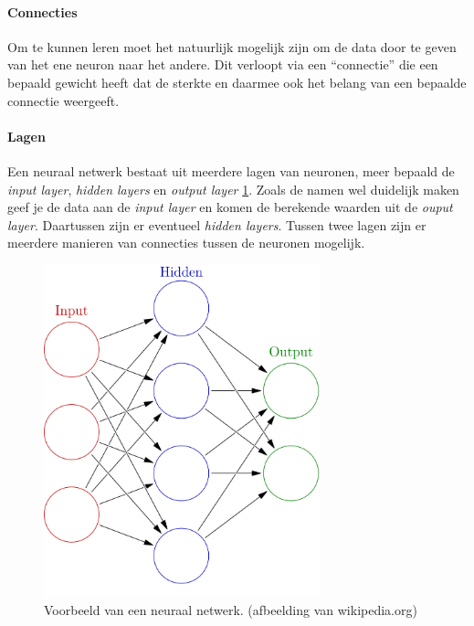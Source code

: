 \documentclass[a4paper,twoside,kulak]{kulakreport}
\begin{document}
\paragraph{Connecties}
Om te kunnen leren moet het natuurlijk mogelijk zijn om de data door te geven van het ene neuron naar het andere. Dit verloopt via een “connectie” die een bepaald gewicht heeft dat de sterkte en daarmee ook het belang van een bepaalde connectie weergeeft.

\paragraph{Lagen}
Een neuraal netwerk bestaat uit meerdere lagen van neuronen, meer bepaald de \emph{input layer}, \emph{hidden layers} en \emph{output layer} \ref{netwerk}. Zoals de namen wel duidelijk maken geef je de data aan de \emph{input layer} en komen de berekende waarden uit de \emph{ouput layer}. Daartussen zijn er eventueel \emph{hidden layers}. Tussen twee lagen zijn er meerdere manieren van connecties tussen de neuronen mogelijk.

\begin{figure}
	\begin{center}
		\includegraphics[width=8cm]{netwerk.png}
	\end{center}
	\caption{Voorbeeld van een neuraal netwerk. (afbeelding van wikipedia.org)}
	\label{netwerk}
\end{figure}
\end{document}
